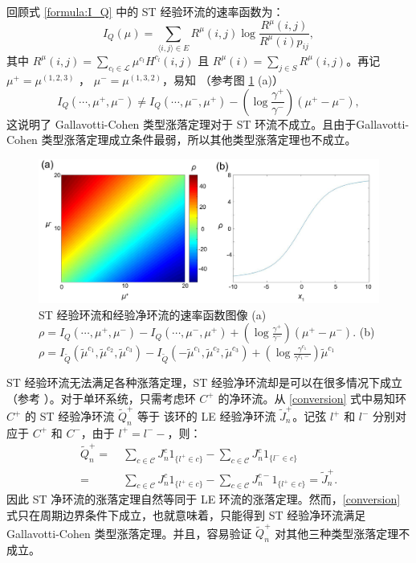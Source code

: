 回顾式 \eqref{formula:I_Q} 中的 ST 经验环流的速率函数为：
\begin{equation*}
I_Q(\mu) = \sum_{\langle i,j\rangle\in E}R^{\mu}(i,j)\log\frac{R^{\mu}(i,j)}{R^{\mu}(i)p_{ij}},
\end{equation*}
其中 $R^{\mu}(i,j)=\sum_{c_l\in\mathcal{L}}\mu^{c_l}H^{c_l}(i,j)$ 且 $R^{\mu}(i)=\sum_{j\in S}R^{\mu}(i,j)$。再记 $\mu^+ = \mu^{(1,2,3)}$ ， $\mu^- = \mu^{(1,3,2)}$，易知 （参考图 \ref{figure:ratefunction} (a)）
\begin{equation*}
I_Q(\cdots,\mu^+,\mu^-)
\neq I_Q(\cdots,\mu^-,\mu^+)-\left(\log\frac{\gamma^+}{\gamma^-}\right)(\mu^+-\mu^-),
\end{equation*}
这说明了 Gallavotti-Cohen 类型涨落定理对于 ST 环流不成立。且由于Gallavotti-Cohen 类型涨落定理成立条件最弱，所以其他类型涨落定理也不成立。
\begin{figure}[h]
	\centering
	\includegraphics[scale=0.25]{chart/ratefunction.pdf}
	\caption{ST 经验环流和经验净环流的速率函数图像 (a) $\rho=I_Q(\cdots,\mu^+,\mu^-)-I_Q(\cdots,\mu^-,\mu^+)+(\log\frac{\gamma^+}{\gamma^-})(\mu^+-\mu^-)$. (b) $\rho=I_{\tilde{Q}}(\tilde{\mu}^{c_1},\tilde{\mu}^{c_2},\tilde{\mu}^{c_3})- I_{\tilde{Q}}(-\tilde{\mu}^{c_1},\tilde{\mu}^{c_2},\tilde{\mu}^{c_3})
		+(\log\frac{\gamma^{c_1}}{\gamma^{c_1-}})\tilde{\mu}^{c_1}$}\label{figure:ratefunction}
\end{figure}
ST 经验环流无法满足各种涨落定理，ST 经验净环流却是可以在很多情况下成立（参考 \cite{andrieux2007fluctuation,bertini2015flows}）。对于单环系统，只需考虑环 $C^+$ 的净环流。从 \eqref{conversion} 式中易知环 $C^+$ 的 ST 经验净环流  $\tilde{Q}^+_n$ 等于 该环的 LE 经验净环流 $\tilde{J}^+_n$。记弦 $l^+$ 和 $l^-$ 分别对应于 $C^+$ 和 $C^-$，由于 $l^+=l^--$，则：
\begin{equation*}\label{circulation}
    \begin{split}
            \tilde{Q}^{+}_n =&\;\sum_{c\in \mathcal{C}}J^c_n1_{\{l^+\in c \}}-\sum_{c\in \mathcal{C}}J^c_n1_{\{l^-\in c \}}\\
            =&\;\sum_{c\in \mathcal{C}}J^c_n1_{\{l^+\in c \}}-\sum_{c\in \mathcal{C}}J^{c-}_n1_{\{l^+\in c \}} = \tilde{J}^+_n.
    \end{split}
\end{equation*}
因此 ST 净环流的涨落定理自然等同于 LE 环流的涨落定理。然而，\eqref{conversion} 式只在周期边界条件下成立，也就意味着，只能得到 ST 经验净环流满足 Gallavotti-Cohen 类型涨落定理。并且，容易验证 $\tilde{Q}^+_n$ 对其他三种类型涨落定理不成立。


